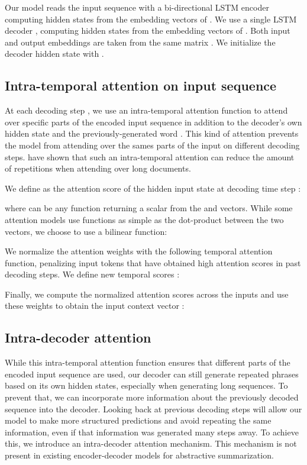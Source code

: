 \documentclass{article} \usepackage{iclr2018_arxiv,times}
\begin{document}
Our model reads the input sequence with a bi-directional LSTM encoder  computing hidden states  from the embedding vectors of . We use a single LSTM decoder , computing hidden states  from the embedding vectors of . Both input and output embeddings are taken from the same matrix . We initialize the decoder hidden state with .

\subsection{Intra-temporal attention on input sequence}
\label{ssec:tmp-attention}

At each decoding step , we use an intra-temporal attention function to attend over specific parts of the encoded input sequence in addition to the decoder's own hidden state and the previously-generated word \citep{sankaran2016}. This kind of attention prevents the model from attending over the sames parts of the input on different decoding steps. \citet{nallapati2016} have shown that such an intra-temporal attention can reduce the amount of repetitions when attending over long documents.


We define  as the attention score of the hidden input state  at decoding time step :

where  can be any function returning a scalar  from the  and  vectors. While some attention models use functions as simple as the dot-product between the two vectors, we choose to use a bilinear function: 


We normalize the attention weights with the following temporal attention function, penalizing input tokens that have obtained high attention scores in past decoding steps. We define new temporal scores :


Finally, we compute the normalized attention scores  across the inputs and use these weights to obtain the input context vector :
\vspace{-5mm}
\begin{multicols}{2}\end{multicols}

\subsection{Intra-decoder attention}
\label{ssec:intra-attention}

While this intra-temporal attention function ensures that different parts of the encoded input sequence are used, our decoder can still generate repeated phrases based on its own hidden states, especially when generating long sequences. To prevent that, we can incorporate more information about the previously decoded sequence into the decoder. Looking back at previous decoding steps will allow our model to make more structured predictions and avoid repeating the same information, even if that information was generated many steps away. 
To achieve this, we introduce an intra-decoder attention mechanism. This mechanism is not present in existing encoder-decoder models for abstractive summarization.
\end{document}
